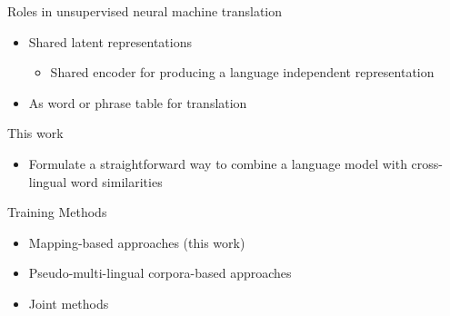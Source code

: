 \documentclass[11pt, a4paper, landscape]{article}
\begin{document}
	\vfill
	\NewPage
	\vfill
	Roles in unsupervised neural machine translation 
	\begin{itemize}
		\item Shared latent representations
		\begin{itemize}
			\item Shared encoder for producing a language independent representation
		\end{itemize}	
		\item As word or phrase table for translation\\
	\end{itemize}	
	This work
	\begin{itemize}
	\item Formulate a straightforward way to combine
		a language model with cross-lingual
		word similarities \\
	\end{itemize}
		
	Training Methods
	
	\begin{itemize}
		\item Mapping-based approaches (this work)

		\item Pseudo-multi-lingual corpora-based approaches

		\item Joint methods

	\end{itemize}

	\vfill


	
	
\end{document}
